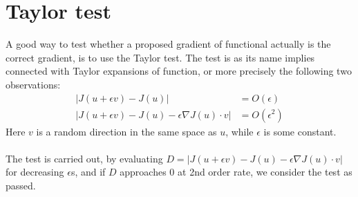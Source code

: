 \documentclass[11pt,a4paper]{article}
\begin{document}
\section{Taylor test}
A good way to test whether a proposed gradient of functional actually is the correct gradient, is to use the Taylor test. The test is as its name implies connected with Taylor expansions of function, or more precisely the following two observations:
\begin{align*}
|J(u+\epsilon v)-J(u)| &= O(\epsilon) \\
|J(u+\epsilon v)-J(u)-\epsilon\nabla J(u)\cdot v| &= O(\epsilon^2)
\end{align*}
Here $v$ is a random direction in the same space as $u$, while $\epsilon$ is some constant. 
\\
\\
The test is carried out, by evaluating $D=|J(u+\epsilon v)-J(u)-\epsilon\nabla J(u)\cdot v|$ for decreasing $\epsilon$s, and if $D$ approaches 0 at 2nd order rate, we consider the test as passed.
\end{document}
